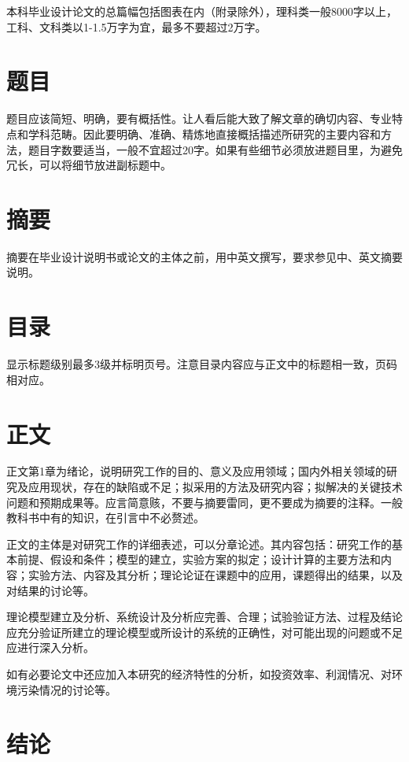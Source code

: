 \documentclass[
	StudentName     = 姓名,
	StudentID       = 学号,
	AdvisorName     = 指导教师,
	Grade           = 年级,
	Major           = 专业,
	Department      = 一个很长很长的名字,
	SubmitYear		= 2022,
	SubmitMonth		= 5,
	Title           = 论文中文题目,
	TitleEng        = {{English Title}}
]{cauc_thesis}
\begin{document}
	
	本科毕业设计论文的总篇\cite{reflabel3,reflabel4,reflabel5}幅包括图表在内（附录除外），理科类一般8000字以上，工科、文科类以1-1.5万字为宜，最多不要超过2万字。
	
	\section{题目}
	
	题目应该简短、明确，要有概括性。让人看后能大致了解文章的确切内容、专业特点和学科范畴。因此要明确、准确、精炼地直接概括描述所研究的主要内容和方法，题目字数要适当，一般不宜超过20字。如果有些细节必须放进题目里，为避免冗长，可以将细节放进副标题中。
	
	\section{摘要}
	
	摘要在毕业设计说明书或论文的主体之前，用中英文撰写，要求参见中、英文摘要说明。
	
	\section{目录}
	
	显示标题级别最多3级并标明页号。注意目录内容应与正文中的标题相一致，页码相对应。
	
	\section{正文}
	
	正文第1章为绪论，说明研究工作的目的、意义及应用领域；国内外相关领域的研究及应用现状，存在的缺陷或不足；拟采用的方法及研究内容；拟解决的关键技术问题和预期成果等。应言简意赅，不要与摘要雷同，更不要成为摘要的注释。一般教科书中有的知识，在引言中不必赘述。
	
	正文的主体是对研究工作的详细表述，可以分章论述。其内容包括：研究工作的基本前提、假设和条件；模型的建立，实验方案的拟定；设计计算的主要方法和内容；实验方法、内容及其分析；理论论证在课题中的应用，课题得出的结果，以及对结果的讨论等。
	
	理论模型建立及分析、系统设计及分析应完善、合理；试验验证方法、过程及结论应充分验证所建立的理论模型或所设计的系统的正确性，对可能出现的问题或不足应进行深入分析。
	
	如有必要论文中还应加入本研究的经济特性的分析，如投资效率、利润情况、对环境污染情况的讨论等。
	
	\section{结论}
	
\end{document}
